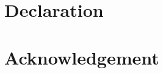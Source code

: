 \documentclass[a4paper,11pt]{report}
\begin{document}
\chapter*{Declaration}

\chapter*{Acknowledgement}

\tableofcontents

\listoffigures

\listoftables

\newpage
{}













\printbibliography[title=References]



\printglossaries
\end{document}
